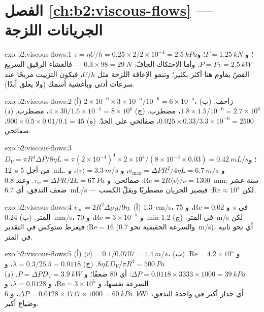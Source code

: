 \section*{الفصل \ref{ch:b2:viscous-flows} --- الجريانات اللزجة}

\begin{solution}{exo:b2:viscous-flows:1}
$\tau = \eta U/h = 0.25 \times 2/2 \times 10^{-4} = \qty{2.5}{kPa}$؛ و $F = \qty{1.25}{kN}$؛
و $P = Fv = \qty{2.5}{kW}$. وأما الاحتكاك الجافّ: $0.3 \times 98 = \qty{29}{N}$ --- فالغشاء
الرقيق السريع القصّ يقاوم هنا أكثر بكثير؛ وتنمو الإعاقة اللزجة
مثل $U/h$، فيكون التزييت مربحًا عند سرعات أدنى وبأغشية أسمك (ولا
يعلق أبدًا).
\end{solution}

\begin{solution}{exo:b2:viscous-flows:2}
(أ) $2 \times 10^{-6} \times 3 \times 10^{-5}/10^{-6} = 6 \times 10^{-5}$، زاحف. (ب)
$1.8 \times 1.5/10^{-6} = 2.7 \times 10^6$، مضطرب. (ج) $4 \times 30/1.5 \times 10^{-5}
= 8 \times 10^6$، مضطرب. (د) $0.025 \times 0.33/3.3 \times 10^{-6} = 2500$،
صفائحي على الحدّ. (ه) $900 \times 0.5 \times 0.01/0.1 = 45$، صفائحي.
\end{solution}

\begin{solution}{exo:b2:viscous-flows:3}
$D_V = \pi R^4\Delta P/8\eta L = \pi(2 \times 10^{-4})^4 \times 2 \times 10^4/(8 \times 10^{-3}
\times 0.03) = \qty{0.42}{mL/s}$؛ و \qty{12}{s} من أجل \qty{5}{mL}. و $v_{\max} = \Delta PR^2/
4\eta L = \qty{6.7}{m/s}$، و $\langle v\rangle = \qty{3.3}{m/s}$، و $\mathrm{Re} = 2R\langle v
\rangle/\nu = 1300$: صفائحي. و $\tau_w = \Delta PR/2L = \qty{67}{Pa}$. وعند \qty{0.8}{mm}:
ستة عشر ضعف التدفق، أي \qty{6.7}{mL/s} --- لكن $\mathrm{Re} \approx 10^4$: فيصير
الجريان مضطربًا ويقلّ الكسب.
\end{solution}

\begin{solution}{exo:b2:viscous-flows:4}
$v_\infty = 2R^2\Delta\rho\,g/9\eta$. (أ) \qty{1.3}{cm/s}، و $\mathrm{Re} = 0.02$، و \qty{75}{s}
في المتر. (ب) \qty{0.24}{mm/s}، و $\mathrm{Re} = 3 \times 10^{-5}$، و \qty{70}{min} في
المتر. (ج) \qty{1.2}{m/s} لكن $\mathrm{Re} = 16$: فيفرط ستوكس في التقدير (والسرعة
الحقيقية نحو \qty{0.7}{m/s})، أي نحو ثانية في المتر.
\end{solution}

\begin{solution}{exo:b2:viscous-flows:5}
(أ) $\langle v\rangle = 0.1/0.0707 = \qty{1.4}{m/s}$، و $\mathrm{Re} = 4.2 \times 10^5$. (ب)
$8\eta LD_V/\pi R^4 = \qty{500}{Pa}$. (ج) $\lambda = 0.3/25.5 = 0.0118$، و $\Delta P = 0.0118
\times 3333 \times 1000 = \qty{39}{kPa}$: أي $80$ ضعفًا؛ و $P = \Delta PD_V = \qty{3.9}{kW}$.
(د) السرعة نفسها، و $\mathrm{Re} = 3 \times 10^5$، و $\lambda = 0.0128$، و $\Delta P = 0.0128 \times 4717
\times 1000 = \qty{60}{kPa}$، و \qty{6}{kW}: أي جدار أكثر في واحدة التدفق، وضياع أكبر.
\end{solution}

